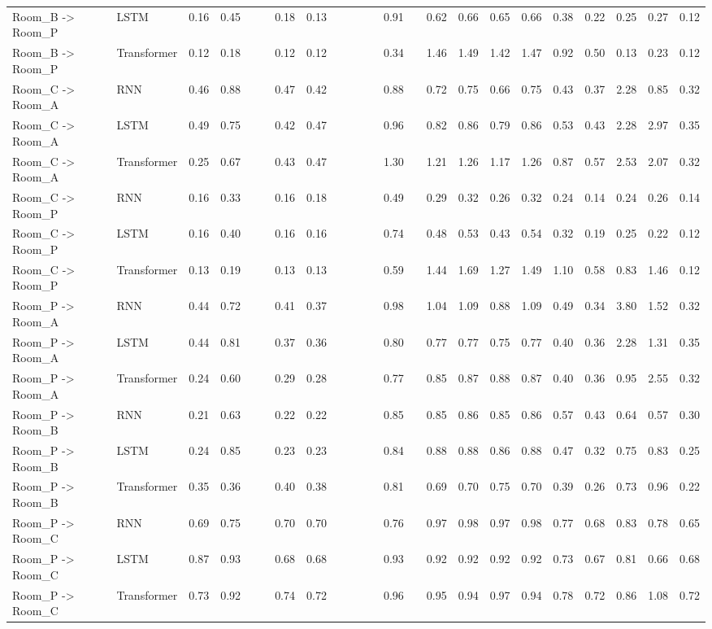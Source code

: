 \begin{tabular}{lllllllllllllllllllllll}
Room_B -> Room_P & LSTM & 0.16 & 0.45 &  &  & 0.18 & 0.13 &  &  &  &  & 0.91 &  & 0.62 & 0.66 & 0.65 & 0.66 & 0.38 & 0.22 & 0.25 & 0.27 & 0.12 \\
Room_B -> Room_P & Transformer & 0.12 & 0.18 &  &  & 0.12 & 0.12 &  &  &  &  & 0.34 &  & 1.46 & 1.49 & 1.42 & 1.47 & 0.92 & 0.50 & 0.13 & 0.23 & 0.12 \\
Room_C -> Room_A & RNN & 0.46 & 0.88 &  &  & 0.47 & 0.42 &  &  &  &  & 0.88 &  & 0.72 & 0.75 & 0.66 & 0.75 & 0.43 & 0.37 & 2.28 & 0.85 & 0.32 \\
Room_C -> Room_A & LSTM & 0.49 & 0.75 &  &  & 0.42 & 0.47 &  &  &  &  & 0.96 &  & 0.82 & 0.86 & 0.79 & 0.86 & 0.53 & 0.43 & 2.28 & 2.97 & 0.35 \\
Room_C -> Room_A & Transformer & 0.25 & 0.67 &  &  & 0.43 & 0.47 &  &  &  &  & 1.30 &  & 1.21 & 1.26 & 1.17 & 1.26 & 0.87 & 0.57 & 2.53 & 2.07 & 0.32 \\
Room_C -> Room_P & RNN & 0.16 & 0.33 &  &  & 0.16 & 0.18 &  &  &  &  & 0.49 &  & 0.29 & 0.32 & 0.26 & 0.32 & 0.24 & 0.14 & 0.24 & 0.26 & 0.14 \\
Room_C -> Room_P & LSTM & 0.16 & 0.40 &  &  & 0.16 & 0.16 &  &  &  &  & 0.74 &  & 0.48 & 0.53 & 0.43 & 0.54 & 0.32 & 0.19 & 0.25 & 0.22 & 0.12 \\
Room_C -> Room_P & Transformer & 0.13 & 0.19 &  &  & 0.13 & 0.13 &  &  &  &  & 0.59 &  & 1.44 & 1.69 & 1.27 & 1.49 & 1.10 & 0.58 & 0.83 & 1.46 & 0.12 \\
Room_P -> Room_A & RNN & 0.44 & 0.72 &  &  & 0.41 & 0.37 &  &  &  &  & 0.98 &  & 1.04 & 1.09 & 0.88 & 1.09 & 0.49 & 0.34 & 3.80 & 1.52 & 0.32 \\
Room_P -> Room_A & LSTM & 0.44 & 0.81 &  &  & 0.37 & 0.36 &  &  &  &  & 0.80 &  & 0.77 & 0.77 & 0.75 & 0.77 & 0.40 & 0.36 & 2.28 & 1.31 & 0.35 \\
Room_P -> Room_A & Transformer & 0.24 & 0.60 &  &  & 0.29 & 0.28 &  &  &  &  & 0.77 &  & 0.85 & 0.87 & 0.88 & 0.87 & 0.40 & 0.36 & 0.95 & 2.55 & 0.32 \\
Room_P -> Room_B & RNN & 0.21 & 0.63 &  &  & 0.22 & 0.22 &  &  &  &  & 0.85 &  & 0.85 & 0.86 & 0.85 & 0.86 & 0.57 & 0.43 & 0.64 & 0.57 & 0.30 \\
Room_P -> Room_B & LSTM & 0.24 & 0.85 &  &  & 0.23 & 0.23 &  &  &  &  & 0.84 &  & 0.88 & 0.88 & 0.86 & 0.88 & 0.47 & 0.32 & 0.75 & 0.83 & 0.25 \\
Room_P -> Room_B & Transformer & 0.35 & 0.36 &  &  & 0.40 & 0.38 &  &  &  &  & 0.81 &  & 0.69 & 0.70 & 0.75 & 0.70 & 0.39 & 0.26 & 0.73 & 0.96 & 0.22 \\
Room_P -> Room_C & RNN & 0.69 & 0.75 &  &  & 0.70 & 0.70 &  &  &  &  & 0.76 &  & 0.97 & 0.98 & 0.97 & 0.98 & 0.77 & 0.68 & 0.83 & 0.78 & 0.65 \\
Room_P -> Room_C & LSTM & 0.87 & 0.93 &  &  & 0.68 & 0.68 &  &  &  &  & 0.93 &  & 0.92 & 0.92 & 0.92 & 0.92 & 0.73 & 0.67 & 0.81 & 0.66 & 0.68 \\
Room_P -> Room_C & Transformer & 0.73 & 0.92 &  &  & 0.74 & 0.72 &  &  &  &  & 0.96 &  & 0.95 & 0.94 & 0.97 & 0.94 & 0.78 & 0.72 & 0.86 & 1.08 & 0.72 \\
\bottomrule
\end{tabular}
